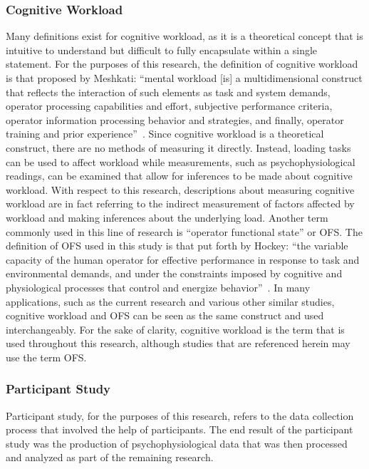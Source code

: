 \documentclass[11pt]{article}
\begin{document}
		\subsubsection{Cognitive Workload}
		Many definitions exist for cognitive workload, as it is a theoretical concept that is intuitive to understand but difficult to fully encapsulate within a single statement. For the purposes of this research, the definition of cognitive workload is that proposed by Meshkati: ``mental workload [is] a multidimensional construct that reflects the interaction of such elements as task and system demands, operator processing capabilities and effort, subjective performance criteria, operator information processing behavior and strategies, and finally, operator training and prior experience''~\cite{Meshkati}. Since cognitive workload is a theoretical construct, there are no methods of measuring it directly. Instead, loading tasks can be used to affect workload while measurements, such as psychophysiological readings, can be examined that allow for inferences to be made about cognitive workload.  With respect to this research, descriptions about measuring cognitive workload are in fact referring to the indirect measurement of factors affected by workload and making inferences about the underlying load. Another term commonly used in this line of research is ``operator functional state'' or OFS. The definition of OFS used in this study is that put forth by Hockey: ``the variable capacity of the human operator for effective performance in response to task and environmental demands, and under the constraints imposed by cognitive and physiological processes that control and energize behavior''~\cite{Hockey}. In many applications, such as the current research and various other similar studies, cognitive workload and OFS can be seen as the same construct and used interchangeably. For the sake of clarity, cognitive workload is the term that is used throughout this research, although studies that are referenced herein may use the term OFS.
		
		\subsubsection{Participant Study}
		Participant study, for the purposes of this research, refers to the data collection process that involved the help of participants. The end result of the participant study was the production of psychophysiological data that was then processed and analyzed as part of the remaining research. 
		
\end{document}
